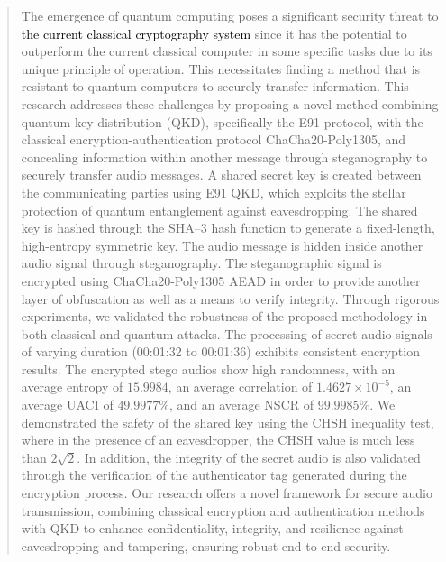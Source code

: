 \documentclass[a4paper]{cas-sc}
\begin{document}



\begin{abstract}
    The emergence of quantum computing poses a significant security threat to \textcolor{black}{the current classical cryptography system} since it has the potential to outperform the current classical computer in some specific tasks due to its unique principle of operation. This necessitates finding a method that is resistant to quantum computers to securely transfer information. This research addresses these challenges by proposing a novel method combining quantum key distribution (QKD), specifically the E91 protocol, with the classical encryption-authentication protocol ChaCha20-Poly1305, and concealing information within another message through steganography to securely transfer audio messages. A shared secret key is created between the communicating parties using E91 QKD, which exploits the stellar protection of quantum entanglement against eavesdropping. The shared key is hashed through the SHA--3 hash function to generate a fixed-length, high-entropy symmetric key. The audio message is hidden inside another audio signal through steganography. The steganographic signal is encrypted using ChaCha20-Poly1305 AEAD in order to provide another layer of obfuscation as well as a means to verify integrity. Through rigorous experiments, we validated the robustness of the proposed methodology in both classical and quantum attacks. The processing of secret audio signals of varying duration (00:01:32 to 00:01:36) exhibits consistent encryption results. The encrypted stego audios show high randomness, with an average entropy of $15.9984$, an average correlation of $1.4627\times 10^{-5}$, an average UACI of $ 49.9977\%$, and an average NSCR of $99.9985\%$.  We demonstrated the safety of the shared key using the CHSH inequality test, where in the presence of an eavesdropper, the CHSH value is much less than $2\sqrt{2}$. In addition, the integrity of the secret audio is also validated through the verification of the authenticator tag generated during the encryption process. Our research offers a novel framework for secure audio transmission, combining classical encryption and authentication methods with QKD to enhance confidentiality, integrity, and resilience against eavesdropping and tampering, ensuring robust end-to-end security.
\end{abstract}
\end{document}
